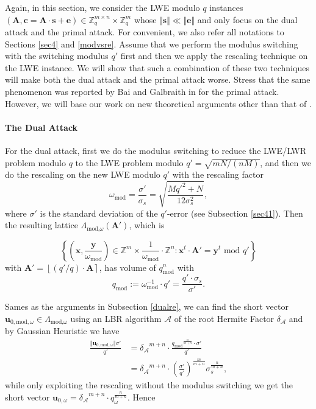\documentclass{cta-author}
\begin{document}
Again, in this section, we consider the LWE modulo $q$ instances   $(\mathbf{A}, \mathbf{c}=\mathbf{A}\cdot \mathbf{s}+\mathbf{e}) \in \mathbb{Z}_q^{m \times n} \times \mathbb{Z}_q^m$  whose $\Vert \mathbf{s}\Vert \ll \Vert \mathbf{e} \Vert$ and only focus on the dual attack and the primal attack. For convenient, we also refer all notations to  Sections \ref{sec4} and \ref{modvsre}. Assume that we perform the modulus switching with the switching modulus $q'$ first and then we apply the rescaling technique on the LWE instance. We will show that such a combination of these two techniques will make both the dual attack and the primal attack worse. Stress that the same phenomenon was reported by Bai and Galbraith in \cite{BG14}  for the primal attack. However, we will base our work  on new theoretical arguments other than that of \cite{BG14}. 





\paragraph{The Dual Attack}


For the dual attack, first we do the modulus switching to reduce the LWE/LWR problem modulo $q$ to the LWE problem modulo $q'=\sqrt{mN/(nM)} $, and then we do the rescaling on the new LWE modulo $q'$ with the rescaling factor 
$$\omega_{\text{mod}}=\frac{\sigma'}{\sigma_s}=\sqrt{\frac{Mq'^2+N}{12\sigma_s^2}},$$ where $\sigma'$ is the standard deviation of the $q'$-error (see Subsection \ref{sec41}).  
Then the resulting lattice $\Lambda_{\text{mod,}\omega}{(\mathbf{A}')}$, which is

\begin{equation*}\label{dualreq}
\left\{ \left(\mathbf{x}, \frac{\mathbf{y}}{\omega_{\text{mod}}}\right) \in \mathbb{Z}^m \times \frac{1}{\omega_{\text{mod}}}\cdot \mathbb{Z}^n:\mathbf{x}^t\cdot \mathbf{A}'=\mathbf{y}^t \text{ mod } q' \right\}
\end{equation*}
with $\mathbf{A}'=\left\lfloor ({q'}/{q}) \cdot \mathbf{A} \right\rceil$, has volume of $q_{\text{mod}}^n$ with $$q_{\text{mod}}:=\omega_{\text{mod}}^{-1}\cdot q'=\frac{q'\cdot \sigma_s}{\sigma'}.$$ 


Sames as the arguments in Subsection \ref{dualre}, we can find the short vector $\mathbf{u}_{0,\text{mod}, {\omega}}\in \Lambda_{\text{mod,}\omega}$ using an LBR algorithm $\mathcal{A}$ of the root Hermite Factor $\delta_{\mathcal{A} }$ and by Gaussian Heuristic we have
\begin{equation*}
\begin{split}
\frac{\Vert \mathbf{u}_{0,\text{mod}, {\omega}}\Vert\sigma'}{q'}&=
{\delta_{\mathcal{A}}}^{m+n}\cdot \frac{{q_{\text{mod}}}^{\frac{n}{m+n}}\cdot \sigma'}{q'}\\
&={\delta_{\mathcal{A}}}^{m+n}\cdot \left(\frac{\sigma'}{q'}\right)^{\frac{m}{m+n}}\sigma_s^{\frac{n}{m+n}},
\end{split}
\end{equation*}
while only exploiting the rescaling without the modulus switching we get the short vector $\mathbf{u}_{0, {\omega}}=
{\delta_{\mathcal{A}}}^{m+n}\cdot q_{\omega}^{\frac{n}{m+n}}.$ Hence
\end{document}
